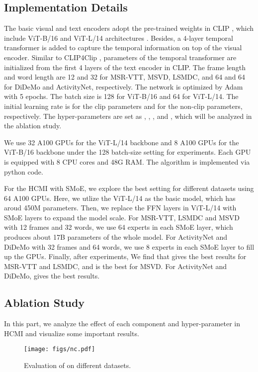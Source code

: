 \documentclass{article}
\begin{document}
\subsection{Implementation Details}
The basic visual and text encoders adopt the pre-trained weights in CLIP \cite{radford2021learning}, which include ViT-B/16 and ViT-L/14 architectures \cite{dosovitskiy2020image}.
Besides, a 4-layer temporal transformer is added to capture the temporal information on top of the visual encoder.
Similar to CLIP4Clip \cite{luo2021clip4clip}, parameters of the temporal transformer are initialized from the first 4 layers of the text encoder in CLIP.
The frame length  and word length  are 12 and 32 for MSR-VTT, MSVD, LSMDC, and 64 and 64 for DiDeMo and ActivityNet, respectively.
The network is optimized by Adam with 5 epochs.
The batch size is 128 for ViT-B/16 and 64 for ViT-L/14.
The initial learning rate is  for the clip parameters and  for the non-clip parameters, respectively.
The hyper-parameters are set as , , , and , which will be analyzed in the ablation study. 

We use 32 A100 GPUs for the ViT-L/14 backbone and 8 A100 GPUs for the ViT-B/16 backbone under the 128 batch-size setting for experiments. 
Each GPU is equipped with 8 CPU cores and 48G RAM.
The algorithm is implemented via python code.

For the HCMI with SMoE, we explore the best setting for different datasets using 64 A100
GPUs. Here, we utlize the ViT-L/14 as the basic model, which has aroud 450M parameters. Then,
we replace the FFN layers in ViT-L/14 with SMoE layers to expand the model scale. For MSR-VTT,
LSMDC and MSVD with 12 frames and 32 words, we use 64 experts in each SMoE layer, which
produces about 17B parameters of the whole model. For ActivityNet and DiDeMo with 32 frames
and 64 words, we use 8 experts in each SMoE layer to fill up the GPUs. Finally, after experiments,
We find that  gives the best results for MSR-VTT and LSMDC, and  is the best for
MSVD. For ActivityNet and DiDeMo,  gives the best results.

\subsection{Ablation Study}
In this part, we analyze the effect of each component and hyper-parameter in HCMI and visualize some important results.

\begin{figure*}[h]
    \centering
    \texttt{[image: figs/nc.pdf]}
    \caption{Evaluation of  on different datasets.}
    \label{fig:hc_hp}
\end{figure*}
\end{document}
